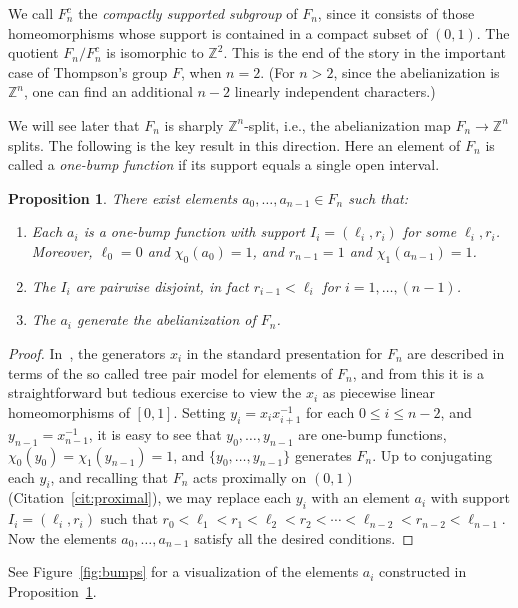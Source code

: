 \documentclass[10pt,a4paper]{article}
\newtheorem{prop}[cdrthm]{Proposition}
\theoremstyle{definition}
\theoremstyle{remark}
\newcommand{\Z}{\mathbb{Z}}
\theoremstyle{plain}
\begin{document}
We call $F_n^c$ the \emph{compactly supported subgroup} of $F_n$, since it consists of those homeomorphisms whose support is contained in a compact subset of $(0, 1)$. The quotient $F_n / F_n^c$ is isomorphic to $\Z^2$. This is the end of the story in the important case of Thompson's group $F$, when $n  = 2$. (For $n > 2$, since the abelianization is $\Z^n$, one can find an additional $n-2$ linearly independent characters.)

We will see later that $F_n$ is sharply $\Z^n$-split, i.e., the abelianization map $F_n\to\Z^n$ splits. The following is the key result in this direction. Here an element of $F_n$ is called a \emph{one-bump function} if its support equals a single open interval.

\begin{prop}\label{prop:modelsplitting}
There exist elements $a_0, \ldots, a_{n-1} \in F_n$ such that:
\begin{enumerate}
\item Each $a_i$ is a one-bump function with support $I_i = (\ell_i, r_i)$ for some $\ell_i,r_i$. Moreover, $\ell_0 = 0$ and $\chi_0(a_0)=1$, and $r_{n-1} = 1$ and $\chi_1(a_{n-1})=1$.
\item The $I_i$ are pairwise disjoint, in fact $r_{i-1} < \ell_i$ for $i = 1, \ldots, (n-1)$.
\item The $a_i$ generate the abelianization of $F_n$.
\end{enumerate}
\end{prop}

\begin{proof}
In~\cite{burillo01}, the generators $x_i$ in the standard presentation for $F_n$ are described in terms of the so called tree pair model for elements of $F_n$, and from this it is a straightforward but tedious exercise to view the $x_i$ as piecewise linear homeomorphisms of $[0,1]$. Setting $y_i=x_ix_{i+1}^{-1}$ for each $0\le i\le n-2$, and $y_{n-1}=x_{n-1}^{-1}$, it is easy to see that $y_0,\dots,y_{n-1}$ are one-bump functions, $\chi_0(y_0)=\chi_1(y_{n-1})=1$, and $\{y_0,\dots,y_{n-1}\}$ generates $F_n$. Up to conjugating each $y_i$, and recalling that $F_n$ acts proximally on $(0,1)$ (Citation~\ref{cit:proximal}), we may replace each $y_i$ with an element $a_i$ with support $I_i = (\ell_i, r_i)$ such that $r_0 < \ell_1 < r_1 < \ell_2 < r_2 < \cdots < \ell_{n-2} < r_{n-2} < \ell_{n-1}$. Now the elements $a_0,\dots,a_{n-1}$ satisfy all the desired conditions.
\end{proof}

See Figure~\ref{fig:bumps} for a visualization of the elements $a_i$ constructed in Proposition~\ref{prop:modelsplitting}.
\end{document}
